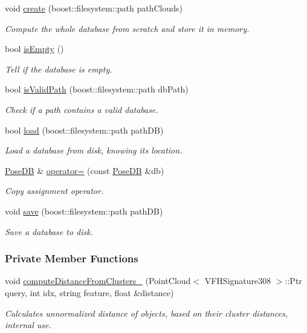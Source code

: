 \begin{DoxyCompactItemize}
void \hyperlink{classPoseDB_a2e1c0fcc4e7144076a5000bb0a41e2c1}{create} (boost\-::filesystem\-::path path\-Clouds)
\begin{DoxyCompactList}\small\item\em Compute the whole database from scratch and store it in memory. \end{DoxyCompactList}\item 
bool \hyperlink{classPoseDB_a2d4a07831798cb574a1b5073a1fd263e}{is\-Empty} ()
\begin{DoxyCompactList}\small\item\em Tell if the database is empty. \end{DoxyCompactList}\item 
bool \hyperlink{classPoseDB_ac561381b23c450367f451dd03543e98e}{is\-Valid\-Path} (boost\-::filesystem\-::path db\-Path)
\begin{DoxyCompactList}\small\item\em Check if a path contains a valid database. \end{DoxyCompactList}\item 
bool \hyperlink{classPoseDB_aa4209b95406472e4eea23cd9bc12eb66}{load} (boost\-::filesystem\-::path path\-D\-B)
\begin{DoxyCompactList}\small\item\em Load a database from disk, knowing its location. \end{DoxyCompactList}\item 
\hyperlink{classPoseDB}{Pose\-D\-B} \& \hyperlink{classPoseDB_a507a78a3550cc572ef9cb1ca0cf76366}{operator=} (const \hyperlink{classPoseDB}{Pose\-D\-B} \&db)
\begin{DoxyCompactList}\small\item\em Copy assignment operator. \end{DoxyCompactList}\item 
void \hyperlink{classPoseDB_a3bc7a3f5efdbf367bf1be91ec4272f60}{save} (boost\-::filesystem\-::path path\-D\-B)
\begin{DoxyCompactList}\small\item\em Save a database to disk. \end{DoxyCompactList}\end{DoxyCompactItemize}
\subsubsection*{Private Member Functions}
\begin{DoxyCompactItemize}
\item 
void \hyperlink{classPoseDB_af5aa1a4a00a7bc8e33881ef57e52b64f}{compute\-Distance\-From\-Clusters\-\_\-} (Point\-Cloud$<$ V\-F\-H\-Signature308 $>$\-::Ptr query, int idx, string feature, float \&distance)
\begin{DoxyCompactList}\small\item\em Calculates unnormalized distance of objects, based on their cluster distances, internal use. \end{DoxyCompactList}\end{DoxyCompactItemize}
